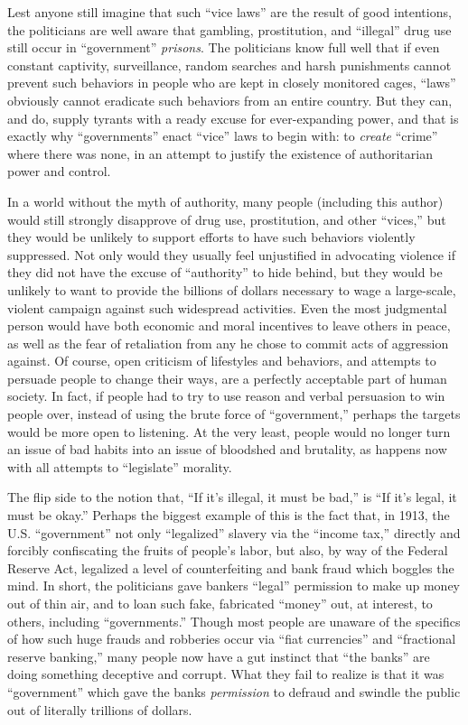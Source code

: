 \documentclass{book}
\begin{document}
Lest anyone still imagine that such \enquote{vice laws} are the result of good intentions, the politicians are well aware that gambling, prostitution, and \enquote{illegal} drug use still occur in \enquote{government} \emph{prisons}. The politicians know full well that if even constant captivity, surveillance, random searches and harsh punishments cannot prevent such behaviors in people who are kept in closely monitored cages, \enquote{laws} obviously cannot eradicate such behaviors from an entire country. But they can, and do, supply tyrants with a ready excuse for ever-expanding power, and that is exactly why \enquote{governments} enact \enquote{vice} laws to begin with: to \emph{create} \enquote{crime} where there was none, in an attempt to justify the existence of authoritarian power and control.

In a world without the myth of authority, many people (including this author) would still strongly disapprove of drug use, prostitution, and other \enquote{vices,} but they would be unlikely to support efforts to have such behaviors violently suppressed. Not only would they usually feel unjustified in advocating violence if they did not have the excuse of \enquote{authority} to hide behind, but they would be unlikely to want to provide the billions of dollars necessary to wage a large-scale, violent campaign against such widespread activities. Even the most judgmental person would have both economic and moral incentives to leave others in peace, as well as the fear of retaliation from any he chose to commit acts of aggression against. Of course, open criticism of lifestyles and behaviors, and attempts to persuade people to change their ways, are a perfectly acceptable part of human society. In fact, if people had to try to use reason and verbal persuasion to win people over, instead of using the brute force of \enquote{government,} perhaps the targets would be more open to listening. At the very least, people would no longer turn an issue of bad habits into an issue of bloodshed and brutality, as happens now with all attempts to \enquote{legislate} morality.

The flip side to the notion that, \enquote{If it's illegal, it must be bad,} is \enquote{If it's legal, it must be okay.} Perhaps the biggest example of this is the fact that, in 1913, the U.S. \enquote{government} not only \enquote{legalized} slavery via the \enquote{income tax,} directly and forcibly confiscating the fruits of people's labor, but also, by way of the Federal Reserve Act, legalized a level of counterfeiting and bank fraud which boggles the mind. In short, the politicians gave bankers \enquote{legal} permission to make up money out of thin air, and to loan such fake, fabricated \enquote{money} out, at interest, to others, including \enquote{governments.} Though most people are unaware of the specifics of how such huge frauds and robberies occur via \enquote{fiat currencies} and \enquote{fractional reserve banking,} many people now have a gut instinct that \enquote{the banks} are doing something deceptive and corrupt. What they fail to realize is that it was \enquote{government} which gave the banks \emph{permission} to defraud and swindle the public out of literally trillions of dollars.
\end{document}
